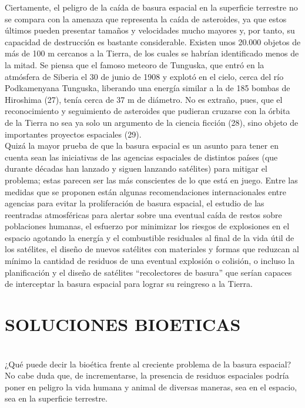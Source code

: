 \documentclass[12pt,letterpaper]{article}
\begin{document}
\begin{multicols}{2}
\noindent Ciertamente, el peligro de la caída de basura espacial
en la superficie terrestre no se compara con la amenaza
que representa la caída de asteroides, ya que estos
últimos pueden presentar tamaños y velocidades mucho
mayores y, por tanto, su capacidad de destrucción es
bastante considerable. Existen unos 20.000 objetos
de más de 100 m cercanos a la Tierra, de los cuales se
habrían identificado menos de la mitad. Se piensa que el
famoso meteoro de Tunguska, que entró en la atmósfera
de Siberia el 30 de junio de 1908 y explotó en el cielo,
cerca del río Podkamenyana Tunguska, liberando una
energía similar a la de 185 bombas de Hiroshima (27),
tenía cerca de 37 m de diámetro. No es extraño, pues,
que el reconocimiento y seguimiento de asteroides que
pudieran cruzarse con la órbita de la Tierra no sea ya
solo un argumento de la ciencia ficción (28), sino objeto
de importantes proyectos espaciales (29).
\\

\noindent Quizá la mayor prueba de que la basura espacial es un
asunto para tener en cuenta sean las iniciativas de las
agencias espaciales de distintos países (que durante
décadas han lanzado y siguen lanzando satélites) para
mitigar el problema; estas parecen ser las más conscientes
de lo que está en juego. Entre las medidas que se
proponen están algunas recomendaciones internacionales
entre agencias para evitar la proliferación de basura
espacial, el estudio de las reentradas atmosféricas
para alertar sobre una eventual caída de restos sobre
poblaciones humanas, el esfuerzo por minimizar los
riesgos de explosiones en el espacio agotando la energía
y el combustible residuales al final de la vida útil de los
satélites, el diseño de nuevos satélites con materiales y
formas que reduzcan al mínimo la cantidad de residuos de
una eventual explosión o colisión, o incluso la planificación
y el diseño de satélites “recolectores de basura” que
serían capaces de interceptar la basura espacial para
lograr su reingreso a la Tierra.
\section*{ \small {SOLUCIONES BIOETICAS}}\\
\noindent ¿Qué puede decir la bioética frente al creciente
problema de la basura espacial? No cabe duda que, de
incrementarse, la presencia de residuos espaciales podría
poner en peligro la vida humana y animal de diversas
maneras, sea en el espacio, sea en la superficie terrestre. 

\end{multicols}
\end{document}
